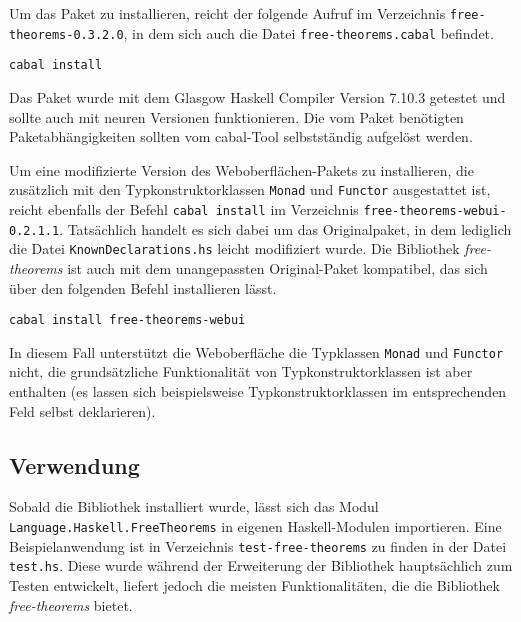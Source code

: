 Um das Paket zu installieren, reicht der folgende Aufruf im Verzeichnis \texttt{free-theorems-0.3.2.0}, in dem sich
auch die Datei \texttt{free-theorems.cabal} befindet.

\begin{verbatim}
cabal install
\end{verbatim}

Das Paket wurde mit dem Glasgow Haskell Compiler Version 7.10.3 getestet und sollte auch mit neuren Versionen
funktionieren. Die vom Paket benötigten Paketabhängigkeiten sollten vom cabal-Tool selbstständig aufgelöst werden.

Um eine modifizierte Version des Weboberflächen-Pakets zu installieren, die zusätzlich mit den Typkonstruktorklassen
\texttt{Monad} und \texttt{Functor} ausgestattet ist, reicht ebenfalls der Befehl \texttt{cabal install} im Verzeichnis
\texttt{free-theorems-webui-0.2.1.1}. Tatsächlich handelt es sich dabei um das Originalpaket, in dem lediglich die
Datei \texttt{KnownDeclarations.hs} leicht modifiziert wurde. Die Bibliothek \textit{free-theorems} ist auch mit dem
unangepassten Original-Paket kompatibel, das sich über den folgenden Befehl installieren lässt.

\begin{verbatim}
cabal install free-theorems-webui
\end{verbatim}

In diesem Fall unterstützt die Weboberfläche die Typklassen \texttt{Monad} und \texttt{Functor} nicht,
die grundsätzliche Funktionalität von Typkonstruktorklassen ist aber enthalten (es lassen sich beispielsweise
Typkonstruktorklassen im entsprechenden Feld selbst deklarieren).


\subsection*{Verwendung}

Sobald die Bibliothek installiert wurde, lässt sich das Modul \texttt{Language.Haskell.FreeTheorems} in eigenen
Haskell-Modulen importieren. Eine Beispielanwendung ist in Verzeichnis \texttt{test-free-theorems} zu finden in der
Datei \texttt{test.hs}. Diese wurde während der Erweiterung der Bibliothek hauptsächlich zum Testen entwickelt,
liefert jedoch die meisten Funktionalitäten, die die Bibliothek \textit{free-theorems} bietet.

